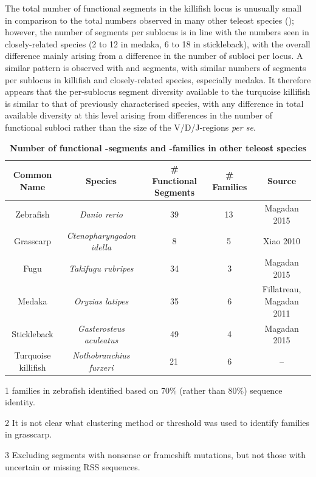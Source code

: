 	The total number of functional \vh segments in the killifish locus is unusually small in comparison to the total numbers observed in many other teleost species (); however, the number of segments per sublocus is in line with the numbers seen in closely-related species (2 to 12 in medaka, 6 to 18 in stickleback), with the overall difference mainly arising from a difference in the number of subloci per locus. A similar pattern is observed with \dh and \jh segments, with similar numbers of segments per sublocus in killifish and closely-related species, especially medaka. It therefore appears that the per-sublocus segment diversity available to the turquoise killifish is similar to that of previously characterised species, with any difference in total available diversity at this level arising from differences in the number of functional subloci rather than the size of the V/D/J-regions \textit{per se}.
	
	\begin{table}
	\begin{threeparttable}
	\caption{\textbf{Number of functional \vh-segments and \vh-families in other teleost species}}
	\label{tab:teleost-vh-counts}
	\begin{tabular}{ccccc}\toprule
	\textbf{Common Name} & \textbf{Species} & \textbf{\# Functional \vh Segments} & \textbf{\# \vh Families} & \textbf{Source}\\\midrule
	Zebrafish & \textit{Danio rerio} & 39 & 13\,\tnote{1} & Magadan 2015 \\
	Grasscarp & \textit{Ctenopharyngodon idella} & 8 & 5\,\tnote{2} & Xiao 2010 \\
	Fugu & \textit{Takifugu rubripes} & 34 & 3 & Magadan 2015 \\
	Medaka & \textit{Oryzias latipes} & 35 & 6 & Fillatreau, Magadan 2011 \\
	Stickleback & \textit{Gasterosteus aculeatus} & 49 & 4 & Magadan 2015 \\
	Turquoise killifish & \textit{Nothobranchius furzeri} & 21\,\tnote{3} & 6 & -- \\
	\bottomrule\end{tabular}
	\begin{tablenotes}
	\item[1] \vh families in zebrafish identified based on 70\% (rather than 80\%) sequence identity.
	\item[2] It is not clear what clustering method or threshold was used to identify \vh families in grasscarp.
	\item[3] Excluding \vh segments with nonsense or frameshift mutations, but not those with uncertain or missing RSS sequences.
	\end{tablenotes}
	\end{threeparttable}
	\end{table} %
	
